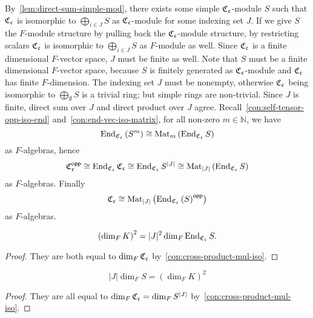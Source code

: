 \begin{construction}\label{con:cross-product-mul-iso}
  By~\cref{lem:direct-sum-simple-mod}, there exists some simple $\operatorname{\mathfrak{C}}_{\mathfrak{c}}$-module $S$ such that $\operatorname{\mathfrak{C}}_{\mathfrak{c}}$ is isomorphic to $\bigoplus_{i\in J}S$ as $\operatorname{\mathfrak{C}}_{\mathfrak{c}}$-module for some indexing set $J$. If we give $S$ the $F$-module structure by pulling back the $\operatorname{\mathfrak{C}}_{\mathfrak{c}}$-module structure, by restricting scalars $\operatorname{\mathfrak{C}}_{\mathfrak{c}}$ is isomorphic to $\bigoplus_{i\in J} S$ as $F$-module as well. Since $\operatorname{\mathfrak{C}}_{\mathfrak{c}}$ is a finite dimensional $F$-vector space, $J$ must be finite as well. Note that $S$ must be a finite dimensional $F$-vector space, because $S$ is finitely generated as $\operatorname{\mathfrak{C}}_{\mathfrak{c}}$-module and $\operatorname{\mathfrak{C}}_{\mathfrak{c}}$ has finite $F$-dimension.
  The indexing set $J$ must be nonempty, otherwise $\operatorname{\mathfrak{C}}_{\mathfrak{c}}$ being isomorphic to $\bigoplus_{\emptyset} S$ is a trivial ring; but simple rings are non-trivial. Since $J$ is finite, direct sum over $J$ and direct product over $J$ agree.
  Recall~\cref{con:self-tensor-opp-iso-end} and~\cref{con:end-vec-iso-matrix}, for all non-zero $m \in\mathbb{N}$, we have
  \[
    \operatorname{End}_{\operatorname{\mathfrak{C}}_{\mathfrak{c}}}\left(S^{m}\right) \cong \operatorname{Mat}_{m}\left(\operatorname{End}_{\operatorname{\mathfrak{C}}_{\mathfrak{c}}}S\right)
  \]
  as $F$-algebras, hence
  \[
    \operatorname{\mathfrak{C}}_{\mathfrak{c}}^{\mathsf{opp}} \cong \operatorname{End}_{\operatorname{\mathfrak{C}}_{\mathfrak{c}}}\operatorname{\mathfrak{C}}_{\mathfrak{c}}\cong \operatorname{End}_{\operatorname{\mathfrak{C}}_{\mathfrak{c}}}S^{|J|} \cong \operatorname{Mat}_{|J|}\left(\operatorname{End}_{\operatorname{\mathfrak{C}}_{\mathfrak{c}}}S\right)
  \]
  as $F$-algebras.
  Finally
  \[
    \operatorname{\mathfrak{C}}_{\mathfrak{c}}\cong \operatorname{Mat}_{|J|}\left(\operatorname{End}_{\operatorname{\mathfrak{C}}_{\mathfrak{c}}}\left(S\right)^{\mathsf{opp}}\right)
  \]
  as $F$-algebras.
  \leanok
\end{construction}

\begin{corollary}\label{cor:dim-eq-1}
  \[
    \left(\dim_{F}K\right)^{2} = |J|^{2}\dim_{F}\operatorname{End}_{\operatorname{\mathfrak{C}}_{\mathfrak{c}}}S.
  \]
  \leanok
\end{corollary}
\begin{proof}
  They are both equal to $\dim_{F}\operatorname{\mathfrak{C}}_{\mathfrak{c}}$ by~\cref{con:cross-product-mul-iso}.
\end{proof}

\begin{corollary}\label{cor:dim-eq-2}
  \[
    |J|\dim_{F}S = \left(\dim_{F}K\right)^{2}
  \]
  \leanok
\end{corollary}
\begin{proof}
  They are all equal to $\dim_{F}\operatorname{\mathfrak{C}}_{\mathfrak{c}} = \dim_{F}S^{|J|}$ by~\cref{con:cross-product-mul-iso}.
\end{proof}

